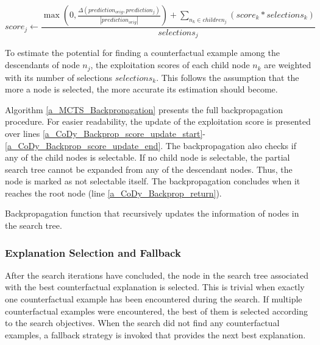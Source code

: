 \begin{equation}
    score_j \gets \frac{
        \max\left(0, \frac{\Delta(prediction_{orig}, prediction_j)}{|prediction_{orig}|}\right) + \sum_{n_k \in children_j} (score_k * selections_k)
    }{
        selections_j
    }
\end{equation}

To estimate the potential for finding a counterfactual example among the descendants of node $n_j$, the exploitation scores of each child node $n_k$ are weighted with its number of selections $selections_k$. This follows the assumption that the more a node is selected, the more accurate its estimation should become.

Algorithm \ref{a_MCTS_Backpropagation} presents the full backpropagation procedure. For easier readability, the update of the exploitation score is presented over lines \ref{a_CoDy_Backprop_score_update_start}-\ref{a_CoDy_Backprop_score_update_end}. The backpropagation also checks if any of the child nodes is selectable. If no child node is selectable, the partial search tree cannot be expanded from any of the descendant nodes. Thus, the node is marked as not selectable itself. The backpropagation concludes when it reaches the root node (line \ref{a_CoDy_Backprop_return}).

{
\setlength{\algomargin}{1.25em}
\small
\begin{algorithm}[ht]
\caption{Backpropagation function that recursively updates the information of nodes in the search tree.}
\label{a_MCTS_Backpropagation}
\end{algorithm}
}



\subsubsection{Explanation Selection and Fallback}
\label{s_Methodology_CoDy_Fallback}
After the search iterations have concluded, the node in the search tree associated with the best counterfactual explanation is selected. This is trivial when exactly one counterfactual example has been encountered during the search. If multiple counterfactual examples were encountered, the best of them is selected according to the search objectives. When the search did not find any counterfactual examples, a fallback strategy is invoked that provides the next best explanation.

